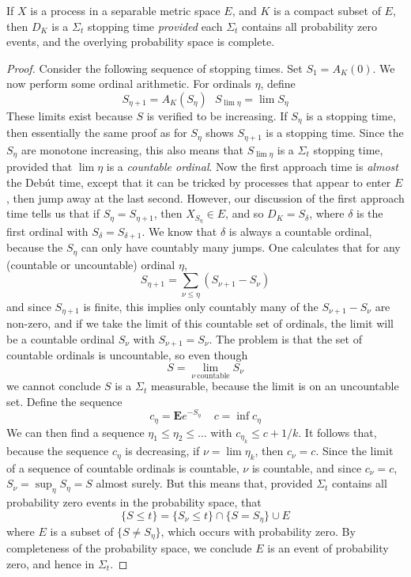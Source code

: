 \begin{theorem}
    If $X$ is a \cadlag process in a separable metric space $E$, and $K$ is a compact subset of $E$, then $D_K$ is a $\Sigma_t$ stopping time {\it provided} each $\Sigma_t$ contains all probability zero events, and the overlying probability space is complete.
\end{theorem}
\begin{proof}
    Consider the following sequence of stopping times. Set $S_1 = A_K(0)$. We now perform some ordinal arithmetic. For ordinals $\eta$, define
    \[ S_{\eta+1} = A_K(S_\eta)\ \ \ S_{\lim \eta} = \lim S_\eta \]
    These limits exist because $S$ is verified to be increasing. If $S_\eta$ is a stopping time, then essentially the same proof as for $S_\eta$ shows $S_{\eta + 1}$ is a stopping time. Since the $S_\eta$ are monotone increasing, this also means that $S_{\lim \eta}$ is a $\Sigma_t$ stopping time, provided that $\lim \eta$ is a {\it countable ordinal}. Now the first approach time is {\it almost} the Deb\'{u}t time, except that it can be tricked by processes that appear to enter $E$, then jump away at the last second. However, our discussion of the first approach time tells us that if $S_\eta = S_{\eta + 1}$, then $X_{S_\eta} \in E$, and so $D_K = S_{\delta}$, where $\delta$ is the first ordinal with $S_\delta = S_{\delta + 1}$. We know that $\delta$ is always a countable ordinal, because the $S_\eta$ can only have countably many jumps. One calculates that for any (countable or uncountable) ordinal $\eta$,
    \[ S_{\eta + 1} = \sum_{\nu \leq \eta} (S_{\nu + 1} - S_\nu) \]
    and since $S_{\eta + 1}$ is finite, this implies only countably many of the $S_{\nu + 1} - S_\nu$ are non-zero, and if we take the limit of this countable set of ordinals, the limit will be a countable ordinal $S_\nu$ with $S_{\nu + 1} = S_\nu$. The problem is that the set of countable ordinals is uncountable, so even though
    \[ S = \lim_{\nu\ \text{countable}} S_\nu \]
    we cannot conclude $S$ is a $\Sigma_t$ measurable, because the limit is on an uncountable set. Define the sequence
    \[ c_\eta = \mathbf{E} e^{- S_\eta}\ \ \ \ \ c = \inf c_\eta \]
    We can then find a sequence $\eta_1 \leq \eta_2 \leq \dots$ with $c_{\eta_k} \leq c + 1/k$. It follows that, because the sequence $c_\eta$ is decreasing, if $\nu = \lim \eta_k$, then $c_{\nu} = c$. Since the limit of a sequence of countable ordinals is countable, $\nu$ is countable, and since $c_\nu = c$, $S_\nu = \sup_\eta S_\eta = S$ almost surely. But this means that, provided $\Sigma_t$ contains all probability zero events in the probability space, that
    \[ \{ S \leq t \} = \{ S_\nu \leq t \} \cap \{ S = S_\eta \} \cup E \]
    where $E$ is a subset of $\{ S \neq S_\eta \}$, which occurs with probability zero. By completeness of the probability space, we conclude $E$ is an event of probability zero, and hence in $\Sigma_t$.
\end{proof}

